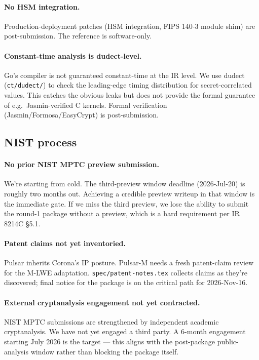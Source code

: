 \paragraph{No HSM integration.}
Production-deployment patches (HSM integration, FIPS 140-3 module
shim) are post-submission. The reference is software-only.

\paragraph{Constant-time analysis is dudect-level.}
Go's compiler is not guaranteed constant-time at the IR level. We
use dudect (\texttt{ct/dudect/}) to check the leading-edge timing
distribution for secret-correlated values. This catches the obvious
leaks but does not provide the formal guarantee of e.g.\
Jasmin-verified C kernels. Formal verification
(Jasmin/Formosa/EasyCrypt) is post-submission.

\subsection{NIST process}

\paragraph{No prior NIST MPTC preview submission.}
We're starting from cold. The third-preview window deadline
(2026-Jul-20) is roughly two months out. Achieving a credible
preview writeup in that window is the immediate gate. If we miss the
third preview, we lose the ability to submit the round-1 package
without a preview, which is a hard requirement per IR 8214C \S5.1.

\paragraph{Patent claims not yet inventoried.}
Pulsar inherits Corona's IP posture. Pulsar-M needs a fresh
patent-claim review for the M-LWE adaptation.
\texttt{spec/patent-notes.tex} collects claims as they're discovered;
final notice for the package is on the critical path for
2026-Nov-16.

\paragraph{External cryptanalysis engagement not yet contracted.}
NIST MPTC submissions are strengthened by independent academic
cryptanalysis. We have not yet engaged a third party. A 6-month
engagement starting July 2026 is the target --- this aligns with the
post-package public-analysis window rather than blocking the package
itself.

